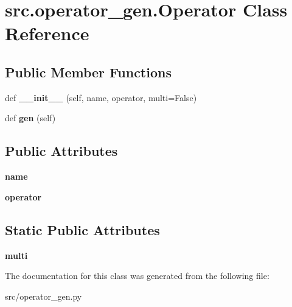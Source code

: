 \hypertarget{classsrc_1_1operator__gen_1_1Operator}{}\section{src.\+operator\+\_\+gen.\+Operator Class Reference}
\label{classsrc_1_1operator__gen_1_1Operator}
\subsection*{Public Member Functions}
\begin{DoxyCompactItemize}
\item 
\mbox{\label{classsrc_1_1operator__gen_1_1Operator_a4b22d090915d41d0814bb5b9662632bb}} 
def {\bfseries \+\_\+\+\_\+init\+\_\+\+\_\+} (self, name, operator, multi=False)
\item 
\mbox{\label{classsrc_1_1operator__gen_1_1Operator_a159119b5a1c6e8dccc1d7e2ef71ac632}} 
def {\bfseries gen} (self)
\end{DoxyCompactItemize}
\subsection*{Public Attributes}
\begin{DoxyCompactItemize}
\item 
\mbox{\label{classsrc_1_1operator__gen_1_1Operator_a1655cab034b2c4df42b0b0d1db642138}} 
{\bfseries name}
\item 
\mbox{\label{classsrc_1_1operator__gen_1_1Operator_a1e578bc37692ea3ca86404adf874a872}} 
{\bfseries operator}
\end{DoxyCompactItemize}
\subsection*{Static Public Attributes}
\begin{DoxyCompactItemize}
\item 
\mbox{\label{classsrc_1_1operator__gen_1_1Operator_afb1f4aa4409dd8a25b2f0f560aafae86}} 
{\bfseries multi}
\end{DoxyCompactItemize}


The documentation for this class was generated from the following file\+:\begin{DoxyCompactItemize}
\item 
src/operator\+\_\+gen.\+py\end{DoxyCompactItemize}
